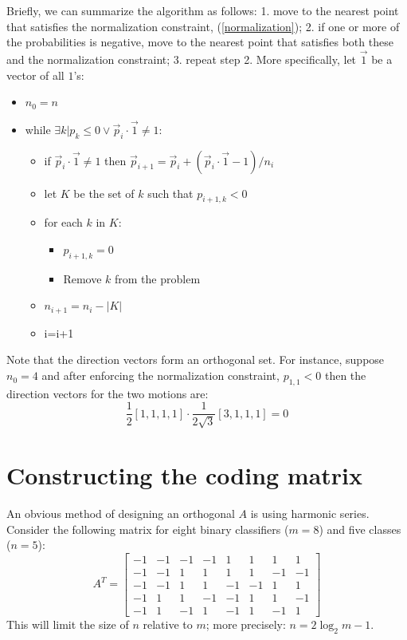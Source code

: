 \documentclass{article}
\begin{document}
Briefly, we can summarize the algorithm as follows:
1. move to the nearest point that satisfies the normalization constraint,
(\ref{normalization}); 2. if one or more of the probabilities is negative,
move to the nearest point that satisfies both these and the normalization
constraint; 3. repeat step 2.
More specifically, let $\vec 1$ be a vector of all $1$'s:
\begin{itemize}
	\item $n_0=n$
	\item while $\exists k| p_k \le 0 \lor \vec p_i \cdot \vec 1 \ne 1$:
	\begin{itemize}
		\item if $\vec p_i \cdot \vec 1 \ne 1$ then 
		$\vec p_{i+1} = \vec p_i + (\vec p_i \cdot \vec 1 - 1)/n_i$
		\item let $K$ be the set of $k$ such that $p_{i+1,k} < 0$
		\item for each $k$ in $K$:
		\begin{itemize}
			\item $p_{i+1,k}=0$
			\item Remove $k$ from the problem
		\end{itemize}
		\item $n_{i+1}=n_i-|K|$
		\item i=i+1
	\end{itemize}
\end{itemize}

Note that the direction vectors form an orthogonal set.
For instance, suppose $n_0=4$ and after enforcing the normalization constraint,
$p_{1,1} < 0$ then the direction vectors for the two motions are:
\begin{equation}
	\frac{1}{2}[1, 1, 1, 1] \cdot \frac{1}{2\sqrt{3}} [3, 1, 1, 1] = 0
\end{equation}

\section{Constructing the coding matrix}

An obvious method of designing an orthogonal $A$ is using harmonic series.
Consider the following matrix for eight binary classifiers ($m=8$) and
five classes ($n=5$):
\begin{equation}
	A^T = \left [ \begin{array}{rrrrrrrr}
			-1 & -1 & -1 & -1 & 1 & 1 & 1 & 1 \\
			-1 & -1 & 1 & 1 & 1 & 1 & -1 & -1 \\
			-1 & -1 & 1 & 1 & -1 & -1 & 1 & 1 \\
			-1 & 1 & 1 & -1 & -1 & 1 & 1 & -1 \\
			-1 & 1 & -1 & 1 & -1 & 1 & -1 & 1
	\end{array} \right ]
\end{equation}
This will limit the size of $n$ relative to $m$; more precisely:
$n=2 \log_2 m - 1$.
\end{document}
